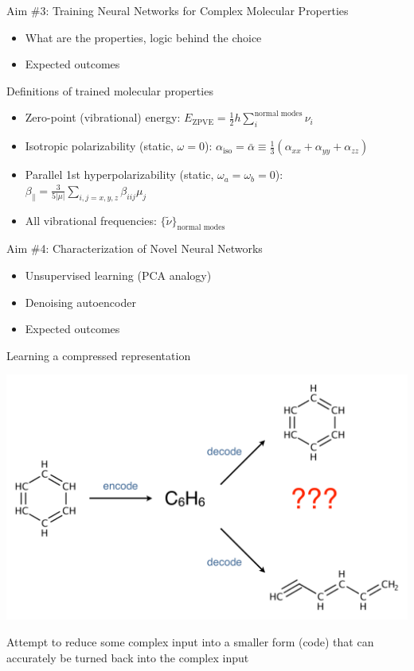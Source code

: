\documentclass[xetex,compress]{beamer}
\begin{document}

\begin{frame}{Aim \#3: Training Neural Networks for Complex Molecular Properties}
  \begin{itemize}
  \item What are the properties, logic behind the choice
  \item Expected outcomes
  \end{itemize}
\end{frame}

\begin{frame}{Definitions of trained molecular properties}
  \begin{itemize}
  \item Zero-point (vibrational) energy: \(E_{\text{ZPVE}} = \frac{1}{2} h \sum_{i}^{\text{normal modes}} \nu_{i}\)
  \item Isotropic polarizability (static, \(\omega = 0\)): \(\alpha_{\text{iso}} = \bar{\alpha} \equiv \frac{1}{3} (\alpha_{xx} + \alpha_{yy} + \alpha_{zz})\)
  \item Parallel 1st hyperpolarizability (static, \(\omega_{a} = \omega_{b} = 0\)): \(\beta_{\parallel} = \frac{3}{5|\mu|} \sum_{i,j=x,y,z} \beta_{iij} \mu_{j}\)
  \item All vibrational frequencies: \(\{\tilde{\nu}\}_{\text{normal modes}}\)
  \end{itemize}
\end{frame}

\begin{frame}{Aim \#4: Characterization of Novel Neural Networks}
  \begin{itemize}
  \item Unsupervised learning (PCA analogy)
  \item Denoising autoencoder
  \item Expected outcomes
  \end{itemize}
\end{frame}

\begin{frame}{Learning a compressed representation}
  \begin{center}
    \includegraphics[width=1.00\textwidth]{./figures/autoencoder_example.pdf}
  \end{center}
  Attempt to reduce some complex input into a smaller form (code) that can accurately be turned back into the complex input
\end{frame}
\end{document}
